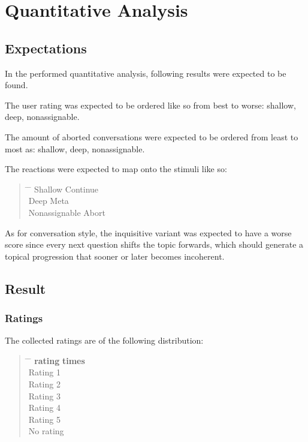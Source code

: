 


\chapter{Quantitative Analysis}

\section{Expectations}

In the performed quantitative analysis,
following results were expected to be found.

The user rating was expected to be ordered like so from best to worse:
shallow, deep, nonassignable.

The amount of aborted conversations were expected to be ordered
from least to most as:
shallow, deep, nonassignable.

The reactions were expected to map onto the stimuli like so:

\begin{quote}
\begin{tabbing}
\hspace{4cm} \= \hspace{4cm} \= \kill %
Shallow \> Continue \\
Deep \> Meta \\
Nonassignable \> Abort \\
\end{tabbing}
\end{quote}

As for conversation style, the inquisitive variant was expected to have a worse score
since every next question shifts the topic forwards, which should generate a topical progression
that sooner or later becomes incoherent.

\section{Result}

\subsection{Ratings}

The collected ratings are of the following distribution:

\begin{quote}
\begin{tabbing}
\hspace{4cm} \= \hspace{4cm} \= \kill %
\textbf{rating} \> \textbf{times} \\
Rating 1  \\
Rating 2  \\
Rating 3  \\
Rating 4  \\
Rating 5  \\
No rating  \\
\end{tabbing}
\end{quote}

